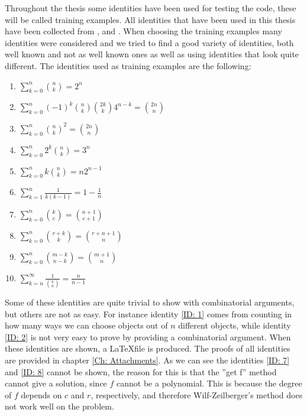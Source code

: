 Throughout the thesis some identities have been used for testing the code, these will be called training examples. All identities that have been used in this thesis have been collected from , and . When choosing the training examples many identities were considered and we tried to find a good variety of identities, both well known and not as well known ones as well as using identities that look quite different. The identities used as training examples are the following:
\begin{enumerate}
  \item $\sum_{k=0}^n \binom{n}{k} = 2^n$ \label{ID: 1}
  \item $\sum_{k=0}^n (-1)^k\binom{n}{k}\binom{2k}{k}4^{n-k}=\binom{2n}{n}$ \label{ID: 2}
  \item $\sum_{k=0}^n \binom{n}{k}^2 = \binom{2n}{n}$ \label{ID: 3}
  \item $\sum_{k=0}^n 2^k\binom{n}{k} = 3^n$ \label{ID: 4}
  \item $\sum_{k=0}^n k\binom{n}{k} = n2^{n-1}$ \label{ID: 5}
  \item $\sum_{k=1}^n \frac{1}{k(k-1)} = 1-\frac{1}{n}$ \label{ID: 6}
  \item $\sum_{k=0}^n \binom{k}{c} = \binom{n+1}{c+1}$ \label{ID: 7}
  \item $\sum_{k=0}^n \binom{r+k}{k} = \binom{r+n+1}{n}$ \label{ID: 8}
  \item $\sum_{k=0}^n \binom{m-k}{n-k} = \binom{m+1}{n}$ \label{ID: 9}
  \item $\sum_{k=n}^\infty \frac{1}{\binom{k}{n}}=\frac{n}{n-1}$ \label{ID: 10}
\end{enumerate}
Some of these identities are quite trivial to show with combinatorial arguments, but others are not as easy. For instance identity \ref{ID: 1} comes from counting in how many ways we can choose objects out of $n$ different objects, while identity \ref{ID: 2} is not very easy to prove by providing a combinatorial argument. When these identities are shown, a \LaTeX file is produced. The proofs of all identities are provided in chapter \ref{Ch: Attachments}. As we can see the identities \ref{ID: 7} and \ref{ID: 8} cannot be shown, the reason for this is that the ''get f'' method cannot give a solution, since $f$ cannot be a polynomial. This is because the degree of $f$ depends on $c$ and $r$, respectively, and therefore Wilf-Zeilberger's method does not work well on the problem.

